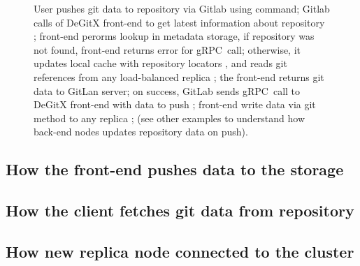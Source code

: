 \begin{figure}
\caption{%
  User pushes git data to repository  via Gitlab using  command;%
  Gitlab calls  of DeGitX front-end to get latest information%
  about repository ; front-end perorms lookup in metadata storage,%
  if repository was not found, front-end returns error for gRPC~call;%
  otherwise, it updates local cache with repository locators , and reads git references from%
  any load-balanced replica ; the front-end returns git data to GitLan server;%
  on success, GitLab sends  gRPC~call to DeGitX front-end with data to push ;%
  front-end write data via  git method to any replica ;%
  (see other examples to understand how back-end nodes updates repository data on push).%
}\label{fig:gitlab-push-gitaly}
\end{figure}

\subsection{How the front-end pushes data to the storage}


\subsection{How the client fetches git data from repository}

\subsection{How new replica node connected to the cluster}

